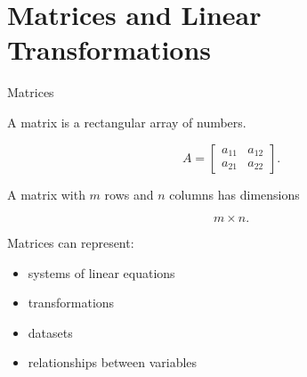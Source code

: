 

\section{Matrices and Linear Transformations}


\begin{frame}{Matrices}

A matrix is a rectangular array of numbers.

\[
A=
\begin{bmatrix}
a_{11} & a_{12}\\
a_{21} & a_{22}
\end{bmatrix}.
\]

\vspace{0.4cm}

A matrix with $m$ rows and $n$ columns has dimensions

\[
\boxed{m\times n}.
\]

\vspace{0.4cm}

Matrices can represent:

\begin{itemize}
    \item systems of linear equations
    \item transformations
    \item datasets
    \item relationships between variables
\end{itemize}

\end{frame}



